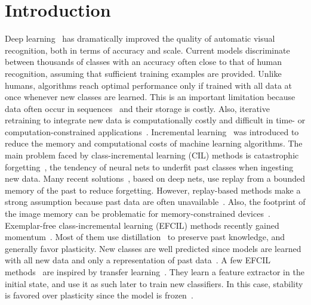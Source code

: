 \documentclass[10pt,twocolumn,letterpaper]{article}
\begin{document}
\section{Introduction}
\label{sec:introduction}
Deep learning~\cite{goodfellow2016deep} has dramatically improved the quality of automatic visual recognition, both in terms of accuracy and scale.
Current models discriminate between thousands of classes with an accuracy often close to that of human recognition, assuming that sufficient training examples are provided. 
Unlike humans, algorithms reach optimal performance only if trained with all data at once whenever new classes are learned. 
This is an important limitation because data often occur in sequences~\cite{lange2019} and their storage is costly.
Also, iterative retraining to integrate new data is computationally costly and difficult in time- or computation-constrained applications~\cite{hayes2022online,ravaglia2021tinyml}.
Incremental learning~\cite{schlimmer1986case} was introduced to reduce the memory and computational costs of machine learning algorithms. 
The main problem faced by class-incremental learning (CIL) methods is catastrophic forgetting~\cite{kemker2018measuring,mccloskey:catastrophic}, the tendency of neural nets to underfit past classes when ingesting new data.
Many recent solutions~\cite{castro2018_e2eil,hou2019_lucir,rebuffi2017_icarl,wu2019_bic,zhao2020_maintaining}, based on deep nets, use replay from a bounded memory of the past to reduce forgetting.
However, replay-based methods make a strong assumption because past data are often unavailable~\cite{venkatesan2017strategy}.
Also, the footprint of the image memory can be problematic for memory-constrained devices~\cite{ravaglia2021tinyml}. 
Exemplar-free class-incremental learning (EFCIL) methods recently gained momentum~\cite{sdc_2020,smith2021always,zhu2021class,zhu2021pass}.
Most of them use distillation~\cite{hinton2015_distillation} to preserve past knowledge, and generally favor plasticity. 
New classes are well predicted since models are learned with all new data and only a representation of past data~\cite{masana2021_study,prabhu2020gdumb,zhu2022self}.
A few EFCIL methods~\cite{belouadah2018_deesil,dhamija2021self} are inspired by transfer learning~\cite{sharif2014cnn,tan2018survey}. They learn a feature extractor in the initial state, and use it as such later to train new classifiers.
In this case, stability is favored over plasticity since the model is frozen~\cite{masana2021_study}.
\end{document}

